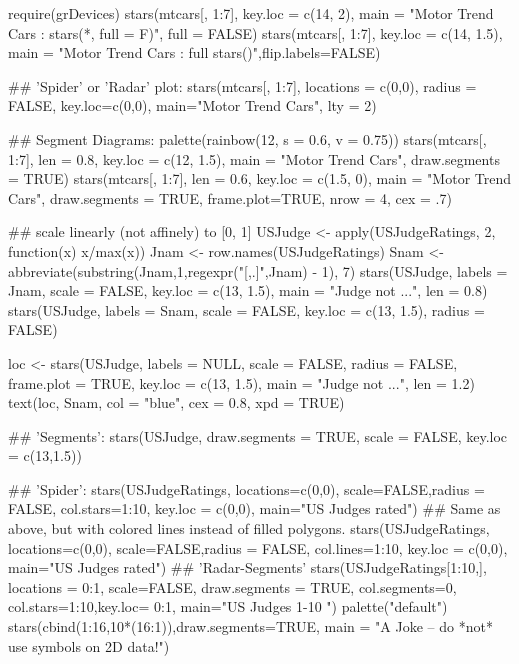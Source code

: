 \begin{Examples}
\begin{ExampleCode}
require(grDevices)
stars(mtcars[, 1:7], key.loc = c(14, 2),
      main = "Motor Trend Cars : stars(*, full = F)", full = FALSE)
stars(mtcars[, 1:7], key.loc = c(14, 1.5),
      main = "Motor Trend Cars : full stars()",flip.labels=FALSE)

## 'Spider' or 'Radar' plot:
stars(mtcars[, 1:7], locations = c(0,0), radius = FALSE,
      key.loc=c(0,0), main="Motor Trend Cars", lty = 2)

## Segment Diagrams:
palette(rainbow(12, s = 0.6, v = 0.75))
stars(mtcars[, 1:7], len = 0.8, key.loc = c(12, 1.5),
      main = "Motor Trend Cars", draw.segments = TRUE)
stars(mtcars[, 1:7], len = 0.6, key.loc = c(1.5, 0),
      main = "Motor Trend Cars", draw.segments = TRUE,
      frame.plot=TRUE, nrow = 4, cex = .7)

## scale linearly (not affinely) to [0, 1]
USJudge <- apply(USJudgeRatings, 2, function(x) x/max(x))
Jnam <- row.names(USJudgeRatings)
Snam <- abbreviate(substring(Jnam,1,regexpr("[,.]",Jnam) - 1), 7)
stars(USJudge, labels = Jnam, scale = FALSE,
      key.loc = c(13, 1.5), main = "Judge not ...", len = 0.8)
stars(USJudge, labels = Snam, scale = FALSE,
      key.loc = c(13, 1.5), radius = FALSE)

loc <- stars(USJudge, labels = NULL, scale = FALSE,
             radius = FALSE, frame.plot = TRUE,
             key.loc = c(13, 1.5), main = "Judge not ...", len = 1.2)
text(loc, Snam, col = "blue", cex = 0.8, xpd = TRUE)

## 'Segments':
stars(USJudge, draw.segments = TRUE, scale = FALSE, key.loc = c(13,1.5))

## 'Spider':
stars(USJudgeRatings, locations=c(0,0), scale=FALSE,radius = FALSE,
      col.stars=1:10, key.loc = c(0,0), main="US Judges rated")
## Same as above, but with colored lines instead of filled polygons.
stars(USJudgeRatings, locations=c(0,0), scale=FALSE,radius = FALSE,
      col.lines=1:10, key.loc = c(0,0), main="US Judges rated")
## 'Radar-Segments'
stars(USJudgeRatings[1:10,], locations = 0:1, scale=FALSE,
      draw.segments = TRUE, col.segments=0, col.stars=1:10,key.loc= 0:1,
       main="US Judges 1-10 ")
palette("default")
stars(cbind(1:16,10*(16:1)),draw.segments=TRUE,
      main = "A Joke -- do *not* use symbols on 2D data!")
\end{ExampleCode}
\end{Examples}
